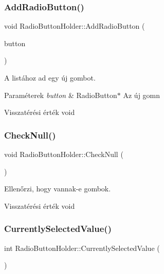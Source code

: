 \subsubsection{\texorpdfstring{Add\+Radio\+Button()}{AddRadioButton()}}
{\footnotesize\ttfamily void Radio\+Button\+Holder\+::\+Add\+Radio\+Button (\begin{DoxyParamCaption}\item[{\hyperlink{class_radio_button}{Radio\+Button} $\ast$}]{button }\end{DoxyParamCaption})}



A listához ad egy új gombot. 


\begin{DoxyParams}{Paraméterek}
{\em button} & Radio\+Button$\ast$ Az új gomn \\
\hline
\end{DoxyParams}
\begin{DoxyReturn}{Visszatérési érték}
void 
\end{DoxyReturn}
\mbox{\label{class_radio_button_holder_aeca94b584cd2a969f38f587f08ff43df}} 
\subsubsection{\texorpdfstring{Check\+Null()}{CheckNull()}}
{\footnotesize\ttfamily void Radio\+Button\+Holder\+::\+Check\+Null (\begin{DoxyParamCaption}{ }\end{DoxyParamCaption})\hspace{0.3cm}{\ttfamily [private]}}



Ellenőrzi, hogy vannak-\/e gombok. 

\begin{DoxyReturn}{Visszatérési érték}
void 
\end{DoxyReturn}
\mbox{\label{class_radio_button_holder_a5ed73396ddd57f3de474a7487429bae3}} 
\subsubsection{\texorpdfstring{Currently\+Selected\+Value()}{CurrentlySelectedValue()}}
{\footnotesize\ttfamily int Radio\+Button\+Holder\+::\+Currently\+Selected\+Value (\begin{DoxyParamCaption}{ }\end{DoxyParamCaption})}



